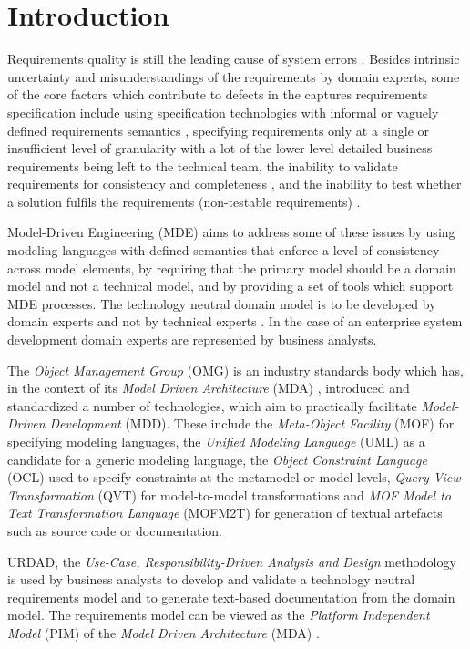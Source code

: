 \section{Introduction}

Requirements quality is still the leading cause of system errors \cite{heck_experiences_2008}. Besides intrinsic uncertainty and misunderstandings of the requirements by domain experts, some of the core factors which contribute to defects in the captures requirements specification include using specification technologies with informal or vaguely defined requirements semantics \cite{ferguson_empirical_2006}, specifying requirements only at a single or insufficient level of granularity with a lot of the lower level detailed business requirements being left to the technical team, the inability to validate requirements for consistency and completeness \cite{somebodyPleaseFindASuitableReference}, and the inability to test whether a solution fulfils the requirements (non-testable requirements) \cite{bashardoust-tajali_extracting_2008}.

Model-Driven Engineering (MDE) aims to address some of these issues by using modeling languages with defined semantics that enforce a level of consistency across model elements, by requiring that the primary model should be a domain model and not a technical model, and by providing a set of tools which support MDE processes. The technology neutral domain model is to be developed by domain experts and not by technical experts \cite{asnina_computation_2010}. In the case of an enterprise system development domain experts are represented by business analysts.

The {\em Object Management Group} (OMG) is an industry standards body which has, in the context of its {\em Model Driven Architecture} (MDA) \cite{siegel_developing_2001}, introduced and standardized a number of technologies, which aim to practically facilitate {\em Model-Driven Development} (MDD). These include the {\em Meta-Object Facility} (MOF) for specifying modeling languages, the {\em Unified Modeling Language} (UML) as a candidate for a generic modeling language, the {\em Object Constraint Language} (OCL) used to specify constraints at the metamodel or model levels, {\em Query View Transformation} (QVT) for model-to-model transformations and {\em MOF Model to Text Transformation Language} (MOFM2T) for generation of textual artefacts such as source code or documentation. 

URDAD, the {\em Use-Case, Responsibility-Driven Analysis and Design} \cite{solms_technology_2007} methodology is used by business analysts to develop and validate a technology neutral requirements model and to generate text-based documentation from the domain model. The requirements model can be viewed as the {\em Platform Independent Model} (PIM) of the {\em Model Driven Architecture} (MDA) \cite{solms_urdad_2010}.

